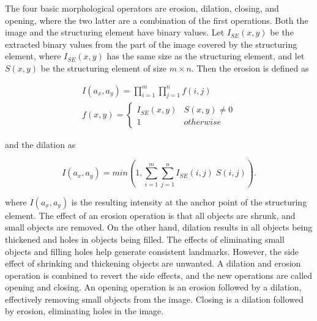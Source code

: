 The four basic morphological operators are erosion, dilation, closing, and opening, where the two latter are a combination of the first operations. Both the image and the structuring element have binary values. Let $I_{SE}(x,y)$ be the extracted binary values from the part of the image covered by the structuring element, where $I_{SE}(x,y)$ has the same size as the structuring element, and let $S(x,y)$ be the structuring element of size $m \times n$. Then the erosion is defined as 

\begin{equation}
    \begin{split}
        I(a_x,a_y) = \prod_{i = 1}^m \prod_{j = 1}^n f(i,j) \\
        f(x,y) = 
        \begin{cases}
        I_{SE}(x,y) & S(x,y) \neq 0 \\
        1 & otherwise
        \end{cases}
    \end{split}
    \label{eq:erosion}
\end{equation}

and the dilation as

\begin{equation}
    I(a_x,a_y) = min(1, \sum_{i = 1}^m \sum_{j = 1}^n I_{SE}(i,j) \; S(i,j)).
    \label{eq:dialation}
\end{equation}

where $I(a_x,a_y)$ is the resulting intensity at the anchor point of the structuring element. The effect of an erosion operation is that all objects are shrunk, and small objects are removed. On the other hand, dilation results in all objects being thickened and holes in objects being filled. The effects of eliminating small objects and filling holes help generate consistent landmarks. However, the side effect of shrinking and thickening objects are unwanted. A dilation and erosion operation is combined to revert the side effects, and the new operations are called opening and closing. An opening operation is an erosion followed by a dilation, effectively removing small objects from the image. Closing is a dilation followed by erosion, eliminating holes in the image. 
